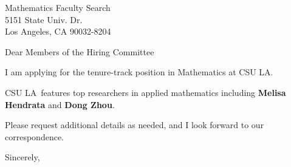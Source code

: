 




	
	
	\def\School{CSU LA}
	
	\begin{letter}
		{Mathematics Faculty Search\\
			5151 State Univ. Dr.\\
			Los Angeles, CA 90032-8204
		}
		
		\opening{Dear Members of the Hiring Committee}
		
		
		I am applying for the tenure-track position in Mathematics at \School. 
		
		
		
		\School~features top researchers in applied mathematics including \textbf{Melisa Hendrata} and \textbf{Dong Zhou}. 
		
		
		
		
		
		Please request additional details as needed, and I look forward to our correspondence.
		
		\closing{Sincerely,}
	\end{letter}
